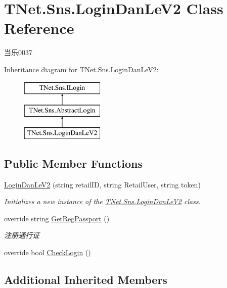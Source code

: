 \hypertarget{class_t_net_1_1_sns_1_1_login_dan_le_v2}{}\section{T\+Net.\+Sns.\+Login\+Dan\+Le\+V2 Class Reference}
\label{class_t_net_1_1_sns_1_1_login_dan_le_v2}


当乐0037  


Inheritance diagram for T\+Net.\+Sns.\+Login\+Dan\+Le\+V2\+:\begin{figure}[H]
\begin{center}
\leavevmode
\includegraphics[height=3.000000cm]{class_t_net_1_1_sns_1_1_login_dan_le_v2}
\end{center}
\end{figure}
\subsection*{Public Member Functions}
\begin{DoxyCompactItemize}
\item 
\mbox{\hyperlink{class_t_net_1_1_sns_1_1_login_dan_le_v2_aa96d81f09709fe24f311c9dd6540ac91}{Login\+Dan\+Le\+V2}} (string retail\+ID, string Retail\+User, string token)
\begin{DoxyCompactList}\small\item\em Initializes a new instance of the \mbox{\hyperlink{class_t_net_1_1_sns_1_1_login_dan_le_v2}{T\+Net.\+Sns.\+Login\+Dan\+Le\+V2}} class. \end{DoxyCompactList}\item 
override string \mbox{\hyperlink{class_t_net_1_1_sns_1_1_login_dan_le_v2_a10382c3e563022d2f0c4f37769f35107}{Get\+Reg\+Passport}} ()
\begin{DoxyCompactList}\small\item\em 注册通行证 \end{DoxyCompactList}\item 
override bool \mbox{\hyperlink{class_t_net_1_1_sns_1_1_login_dan_le_v2_aa75919b2831492c20ce5952e1c506564}{Check\+Login}} ()
\end{DoxyCompactItemize}
\subsection*{Additional Inherited Members}


